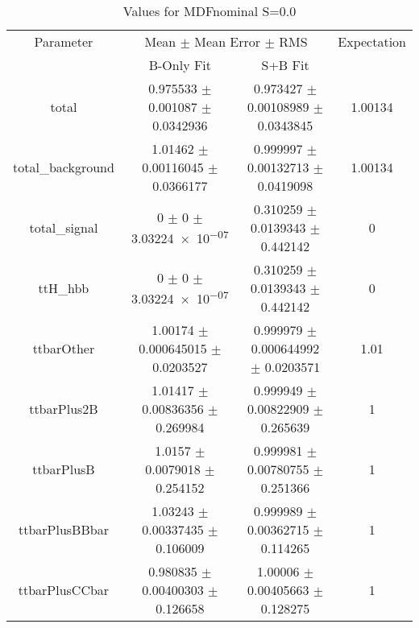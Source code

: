 \begin{table}
\centering
\caption{Values for MDFnominal S=0.0}
\begin{tabular}{cccc}
\toprule
Parameter & \multicolumn{2}{c}{Mean $\pm$ Mean Error $\pm$ RMS} & Expectation\\
 & B-Only Fit & S+B Fit & \\
\midrule
total & \num{0.975533} $\pm$ \num{0.001087} $\pm$ \num{0.0342936} & \num{0.973427} $\pm$ \num{0.00108989} $\pm$ \num{0.0343845} & \num{1.00134}\\
total\_background & \num{1.01462} $\pm$ \num{0.00116045} $\pm$ \num{0.0366177} & \num{0.999997} $\pm$ \num{0.00132713} $\pm$ \num{0.0419098} & \num{1.00134}\\
total\_signal & \num{0} $\pm$ \num{0} $\pm$ \num{3.03224e-07} & \num{0.310259} $\pm$ \num{0.0139343} $\pm$ \num{0.442142} & \num{0}\\
ttH\_hbb & \num{0} $\pm$ \num{0} $\pm$ \num{3.03224e-07} & \num{0.310259} $\pm$ \num{0.0139343} $\pm$ \num{0.442142} & \num{0}\\
ttbarOther & \num{1.00174} $\pm$ \num{0.000645015} $\pm$ \num{0.0203527} & \num{0.999979} $\pm$ \num{0.000644992} $\pm$ \num{0.0203571} & \num{1.01}\\
ttbarPlus2B & \num{1.01417} $\pm$ \num{0.00836356} $\pm$ \num{0.269984} & \num{0.999949} $\pm$ \num{0.00822909} $\pm$ \num{0.265639} & \num{1}\\
ttbarPlusB & \num{1.0157} $\pm$ \num{0.0079018} $\pm$ \num{0.254152} & \num{0.999981} $\pm$ \num{0.00780755} $\pm$ \num{0.251366} & \num{1}\\
ttbarPlusBBbar & \num{1.03243} $\pm$ \num{0.00337435} $\pm$ \num{0.106009} & \num{0.999989} $\pm$ \num{0.00362715} $\pm$ \num{0.114265} & \num{1}\\
ttbarPlusCCbar & \num{0.980835} $\pm$ \num{0.00400303} $\pm$ \num{0.126658} & \num{1.00006} $\pm$ \num{0.00405663} $\pm$ \num{0.128275} & \num{1}\\
\bottomrule
\end{tabular}
\end{table}